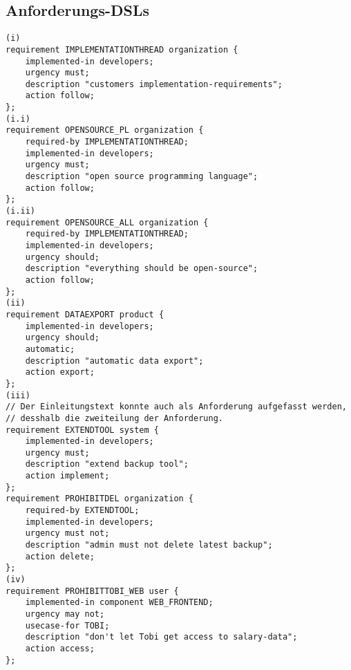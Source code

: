\documentclass{article}
\begin{document}
\subsection{Anforderungs-DSLs}
\begin{verbatim}
(i)
requirement IMPLEMENTATIONTHREAD organization {
    implemented-in developers;
    urgency must;
    description "customers implementation-requirements";
    action follow;
};
(i.i)
requirement OPENSOURCE_PL organization {
    required-by IMPLEMENTATIONTHREAD;
    implemented-in developers;
    urgency must;
    description "open source programming language";
    action follow;
};
(i.ii)
requirement OPENSOURCE_ALL organization {
    required-by IMPLEMENTATIONTHREAD;
    implemented-in developers;
    urgency should;
    description "everything should be open-source";
    action follow;
};
(ii)
requirement DATAEXPORT product {
    implemented-in developers;
    urgency should;
    automatic;
    description "automatic data export";
    action export;
};
(iii)
// Der Einleitungstext konnte auch als Anforderung aufgefasst werden, 
// desshalb die zweiteilung der Anforderung.
requirement EXTENDTOOL system {
    implemented-in developers;
    urgency must;
    description "extend backup tool";
    action implement;
};
requirement PROHIBITDEL organization {
    required-by EXTENDTOOL;
    implemented-in developers;
    urgency must not;
    description "admin must not delete latest backup";
    action delete;
};
(iv)
requirement PROHIBITTOBI_WEB user {
    implemented-in component WEB_FRONTEND;
    urgency may not;
    usecase-for TOBI;
    description "don't let Tobi get access to salary-data";
    action access;
};
\end{verbatim}
\end{document}
